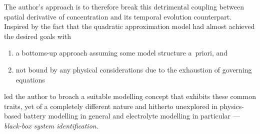 The author's  approach is to  therefore break this detrimental  coupling between
spatial  derivative of  concentration  and its  temporal evolution  counterpart.
Inspired by the fact that the  quadratic approximation model had almost achieved
the desired goals with
\begin{enumerate}[label=\emph{\alph*})]
    \item a bottoms-up approach \ie{} assuming some model structure a~priori, and
    \item not bound by any physical considerations due to the exhaustion of governing equations
\end{enumerate}
led  the author  to  broach a  suitable modelling  concept  that exhibits  these
common  traits, yet  of a  completely different  nature and  hitherto unexplored
in  physics-based battery  modelling  in general  and  electrolyte modelling  in
particular --- \emph{black-box system identification}.

